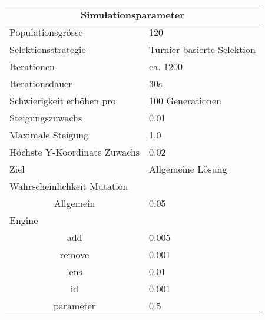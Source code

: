 
    \begin{tabular}{ | l | l | }
      \hline
      \multicolumn{2}{|c|}{Simulationsparameter} \\
      \hline
      Populationsgrösse & 120 \\ \hline
      Selektionsstrategie & Turnier-basierte Selektion \\ \hline
      Iterationen & ca. 1200 \\ \hline
      Iterationsdauer & 30s \\ \hline
      Schwierigkeit erhöhen pro & 100 Generationen \\ \hline
      Steigungszuwachs & 0.01 \\ \hline
      Maximale Steigung & 1.0 \\ \hline
      Höchste Y-Koordinate Zuwachs  & 0.02 \\ \hline
      Ziel & Allgemeine Lösung \\ \hline
      \multicolumn{2}{|l|}{Wahrscheinlichkeit Mutation}\\ \hline
      \multicolumn{1}{|c|}{Allgemein} & 0.05 \\ \hline
      Engine &  \\ \hline
      \multicolumn{1}{|c|}{add} & 0.005 \\ \hline
      \multicolumn{1}{|c|}{remove} & 0.001 \\ \hline
      \multicolumn{1}{|c|}{lens} & 0.01 \\ \hline
      \multicolumn{1}{|c|}{id} & 0.001 \\ \hline
      \multicolumn{1}{|c|}{parameter} & 0.5 \\ \hline
    \end{tabular}
